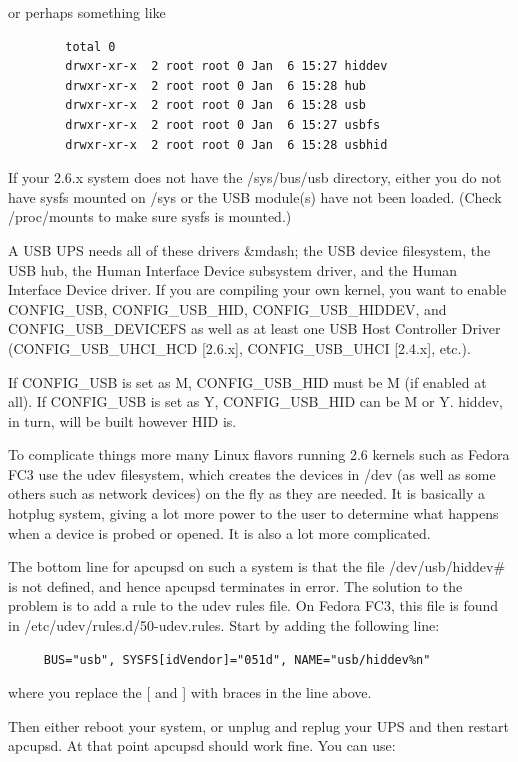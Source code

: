 or perhaps something like 

\footnotesize
\begin{verbatim}
        total 0
        drwxr-xr-x  2 root root 0 Jan  6 15:27 hiddev
        drwxr-xr-x  2 root root 0 Jan  6 15:28 hub
        drwxr-xr-x  2 root root 0 Jan  6 15:28 usb
        drwxr-xr-x  2 root root 0 Jan  6 15:27 usbfs
        drwxr-xr-x  2 root root 0 Jan  6 15:28 usbhid
\end{verbatim}
\normalsize

If your 2.6.x system does not have the /sys/bus/usb directory, either you do
not have sysfs mounted on /sys or the USB module(s) have not been loaded. 
(Check /proc/mounts to make sure sysfs is mounted.)  

A USB UPS needs all of these drivers \&mdash; the USB device filesystem, the
USB hub, the Human Interface Device subsystem driver, and the Human Interface
Device driver. If you are compiling your own kernel, you want to enable
CONFIG\_USB, CONFIG\_USB\_HID, CONFIG\_USB\_HIDDEV, and CONFIG\_USB\_DEVICEFS
as well as at least one USB Host Controller Driver (CONFIG\_USB\_UHCI\_HCD
[2.6.x], CONFIG\_USB\_UHCI [2.4.x], etc.).  

If CONFIG\_USB is set as M, CONFIG\_USB\_HID must be M (if enabled at all). If
CONFIG\_USB is set as Y, CONFIG\_USB\_HID can be M or Y. hiddev, in turn, will
be built however HID is.  

To complicate things more many Linux flavors running 2.6 kernels such as
Fedora FC3 use the udev filesystem, which creates the devices in /dev (as well
as some others such as network devices) on the fly as they are needed. It is
basically a hotplug system, giving a lot more power to the user to determine
what happens when a device is probed or opened. It is also a lot more
complicated.  

The bottom line for apcupsd on such a system is that the file
/dev/usb/hiddev\# is not defined, and hence apcupsd terminates in error. The
solution to the problem is to add a rule to the udev rules file.  On Fedora
FC3, this file is found in /etc/udev/rules.d/50-udev.rules. Start by adding
the following line: 

\footnotesize
\begin{verbatim}
     BUS="usb", SYSFS[idVendor]="051d", NAME="usb/hiddev%n"
\end{verbatim}
\normalsize

where you replace the [ and ] with braces in the line above.  

Then either reboot your system, or unplug and replug your UPS and then restart
apcupsd. At that point apcupsd should work fine.  You can use: 

